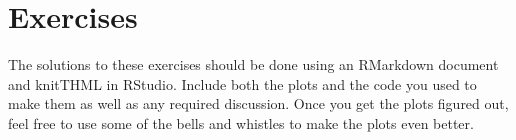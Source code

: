 \documentclass[twoside]{book}\usepackage[]{graphicx}\usepackage[]{xcolor}
\newcommand{\Rindex}[1]{\index{\texttt{#1}}}
\newcommand{\function}[1]{{\color{purple!75!blue}\texttt{\StrSubstitute{#1}{()}{}()}}\Rindex{#1}}
\newcommand{\option}[1]{{\color{brown!80!black}\texttt{#1}}}
\def\R{{\sf R}}
\newcounter{example}[section]
\begin{document}
% 
% 
% 
% 
% 
% 


\section{Exercises}

The solutions to these exercises should be done using an RMarkdown document
and knitTHML in RStudio.
Include both the plots and the code you used to make them as well as any
required discussion.  Once you get the plots figured out, feel free to 
use some of the bells and whistles to make the plots even better.
\end{document}
